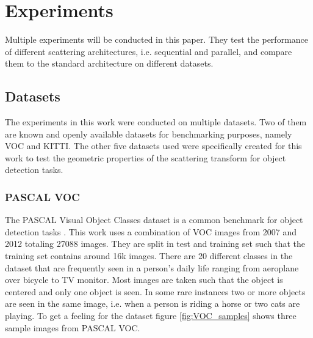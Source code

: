 \chapter{Experiments}
\label{chap:experiments}

Multiple experiments will be conducted in this paper. They test the performance of different scattering architectures, i.e. sequential and parallel, and compare them to the standard architecture on different datasets.
	
\section{Datasets}

The experiments in this work were conducted on multiple datasets. Two of them are known and openly available datasets for benchmarking purposes, namely VOC and KITTI. The other five datasets used were specifically created for this work to test the geometric properties of the scattering transform for object detection tasks. 

\subsection{PASCAL VOC}

The PASCAL Visual Object Classes dataset is a common benchmark for object detection tasks \cite{VOC}. This work uses a combination of VOC images from 2007 and 2012 totaling 27088 images. They are split in test and training set such that the training set contains around 16k images. There are 20 different classes in the dataset that are frequently seen in a person's daily life ranging from aeroplane over bicycle to TV monitor. Most images are taken such that the object is centered and only one object is seen. In some rare instances two or more objects are seen in the same image, i.e. when a person is riding a horse or two cats are playing. To get a feeling for the dataset figure \ref{fig:VOC_samples} shows three sample images from PASCAL VOC.

